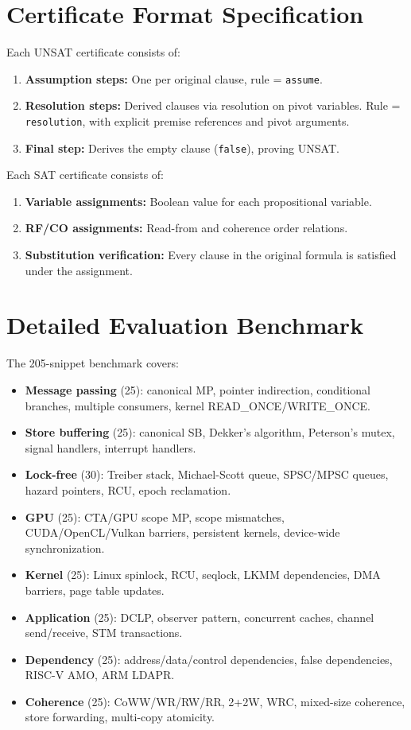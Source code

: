 \documentclass[11pt]{article}
\begin{document}
\section{Certificate Format Specification}
\label{app:cert-format}

Each UNSAT certificate consists of:
\begin{enumerate}[nosep]
\item \textbf{Assumption steps:} One per original clause, rule = \texttt{assume}.
\item \textbf{Resolution steps:} Derived clauses via resolution on pivot variables.
  Rule = \texttt{resolution}, with explicit premise references and pivot arguments.
\item \textbf{Final step:} Derives the empty clause (\texttt{false}), proving UNSAT.
\end{enumerate}

Each SAT certificate consists of:
\begin{enumerate}[nosep]
\item \textbf{Variable assignments:} Boolean value for each propositional variable.
\item \textbf{RF/CO assignments:} Read-from and coherence order relations.
\item \textbf{Substitution verification:} Every clause in the original formula is
  satisfied under the assignment.
\end{enumerate}

\section{Detailed Evaluation Benchmark}
\label{app:benchmark}

The 205-snippet benchmark covers:
\begin{itemize}[nosep]
\item \textbf{Message passing} (25): canonical MP, pointer indirection,
  conditional branches, multiple consumers, kernel READ\_ONCE/WRITE\_ONCE.
\item \textbf{Store buffering} (25): canonical SB, Dekker's algorithm,
  Peterson's mutex, signal handlers, interrupt handlers.
\item \textbf{Lock-free} (30): Treiber stack, Michael-Scott queue,
  SPSC/MPSC queues, hazard pointers, RCU, epoch reclamation.
\item \textbf{GPU} (25): CTA/GPU scope MP, scope mismatches, CUDA/OpenCL/Vulkan
  barriers, persistent kernels, device-wide synchronization.
\item \textbf{Kernel} (25): Linux spinlock, RCU, seqlock, LKMM dependencies,
  DMA barriers, page table updates.
\item \textbf{Application} (25): DCLP, observer pattern, concurrent caches,
  channel send/receive, STM transactions.
\item \textbf{Dependency} (25): address/data/control dependencies,
  false dependencies, RISC-V AMO, ARM LDAPR.
\item \textbf{Coherence} (25): CoWW/WR/RW/RR, 2+2W, WRC, mixed-size
  coherence, store forwarding, multi-copy atomicity.
\end{itemize}
\end{document}
